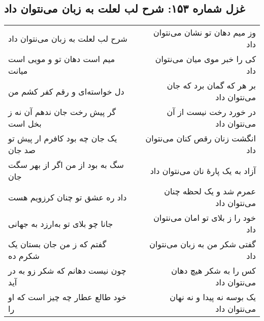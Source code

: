 \begin{center}
\section*{غزل شماره ۱۵۳: شرح لب لعلت به زبان می‌نتوان داد}
\label{sec:153}
\begin{longtable}{l p{0.5cm} r}
شرح لب لعلت به زبان می‌نتوان داد
&&
وز میم دهان تو نشان می‌نتوان داد
\\
میم است دهان تو و مویی است میانت
&&
کی را خبر موی میان می‌نتوان داد
\\
دل خواسته‌ای و رقم کفر کشم من
&&
بر هر که گمان برد که جان می‌نتوان داد
\\
گر پیش رخت جان ندهم آن نه ز بخل است
&&
در خورد رخت نیست از آن می‌نتوان داد
\\
یک جان چه بود کافرم ار پیش تو صد جان
&&
انگشت زنان رقص کنان می‌نتوان داد
\\
سگ به بود از من اگر از بهر سگت جان
&&
آزاد به یک پارهٔ نان می‌نتوان داد
\\
داد ره عشق تو چنان کرزویم هست
&&
عمرم شد و یک لحظه چنان می‌نتوان داد
\\
جانا چو بلای تو به‌ارزد به جهانی
&&
خود را ز بلای تو امان می‌نتوان داد
\\
گفتم که ز من جان بستان یک شکرم ده
&&
گفتی شکر من به زبان می‌نتوان داد
\\
چون نیست دهانم که شکر زو به در آید
&&
کس را به شکر هیچ دهان می‌نتوان داد
\\
خود طالع عطار چه چیز است که او را
&&
یک بوسه نه پیدا و نه نهان می‌نتوان داد
\\
\end{longtable}
\end{center}
